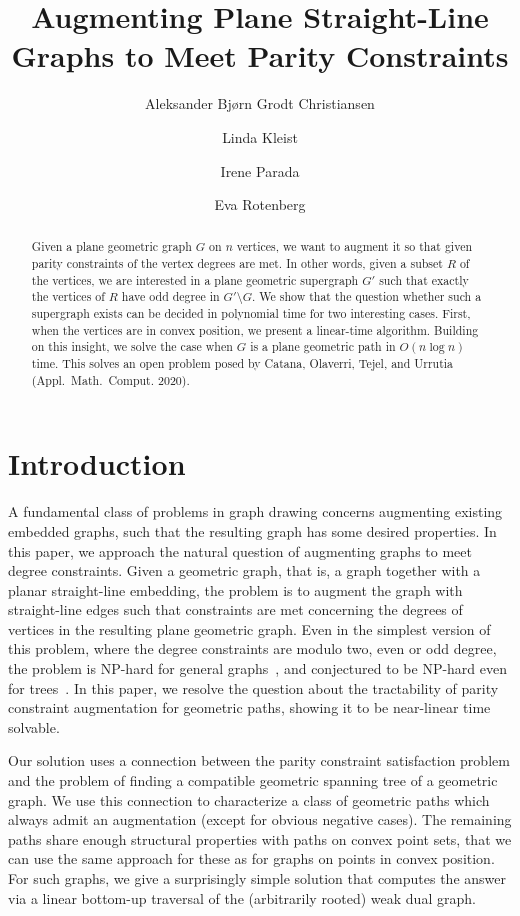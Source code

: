 \documentclass[a4paper,runningheads,cleveref,thm-restate]{lipics-v2021}
\title{Augmenting Plane Straight-Line Graphs to Meet Parity Constraints}
\author{Aleksander Bjørn Grodt Christiansen}{Technical University of Denmark, Denmark }{abgch@dtu.dk}{https://orcid.org/0000-0002-9486-9115}{Supported by the VILLUM Foundation grant 37507 ``Efficient Recomputations for Changeful Problems''}
\author{Linda Kleist}{Universität Potsdam, Potsdam, Germany}{linda.kleist.1@uni-potsdam.de}{https://orcid.org/0000-0002-3786-916X}{}
\author{Irene Parada}{Universitat Politècnica de Catalunya, Spain }{irene.parada@upc.edu}{https://orcid.org/0000-0003-3147-0083}{Serra Húnter fellow and acknowledges the support of Independent Research Fund Denmark grant 2020-2023 (9131-00044B) ``Dynamic Network Analysis'', the Margarita Salas Fellowship funded by the Ministry of Universities of Spain and the EU (NextGenerationEU), and grants PID2019-104129GB-I00 and PID2023-150725NB-I00 funded by MICIU/AEI/10.13039/
	501100011033.}
\author{Eva Rotenberg}{Technical University of Denmark, Denmark}{erot@dtu.dk}{https://orcid.org/0000-0001-5853-7909}{Partially supported by the VILLUM Foundation grant 37507 ``Efficient Recomputations for Changeful Problems'' and the Independent Research Fund Denmark grant 2020-2023 (9131-00044B) ``Dynamic Network Analysis''.}
\begin{document}
\maketitle
%
\begin{abstract}
	Given a plane geometric graph $G$ on $n$ vertices, we want to augment it so that given parity constraints of the vertex degrees are met.
	In other words, given a subset $R$ of the vertices, we are interested in a plane geometric 
	supergraph $G'$ such that exactly the vertices of $R$ have odd degree in $G'\setminus G$.
	We show that the question whether such a supergraph exists can be decided in 
	polynomial time 
	for two interesting cases. 
	First, when the vertices are in convex position, we present a linear-time algorithm. 
	Building on this insight, we solve the case when $G$ is a plane geometric path in $O(n \log n)$ time. 
	This solves an open problem posed by Catana, Olaverri, Tejel, and Urrutia (Appl.\ Math.\ Comput. 2020). 	
\end{abstract}

\section{Introduction}

A fundamental class of problems in graph drawing concerns augmenting existing embedded graphs, such that the resulting graph has some desired properties. In this paper, we approach the natural question of augmenting graphs to meet degree constraints. Given a geometric graph, that is, a graph together with a planar straight-line embedding, the problem is to augment the graph with straight-line edges such that constraints are met concerning the degrees of vertices in the resulting plane geometric graph. Even in the simplest version of this problem, where the degree constraints are modulo two, even or odd degree, the problem is NP-hard for general graphs~\cite{Catanaetal}, and conjectured to be NP-hard even for trees~\cite{Catanaetal}. In this paper, we resolve the question about the tractability of parity constraint augmentation for geometric paths, showing it to be near-linear time solvable. 

Our solution uses a connection between the parity constraint satisfaction problem and the problem of finding a compatible geometric spanning tree of a geometric graph. We use this connection to characterize a %
class of geometric paths which always admit an augmentation (except for obvious negative cases). The remaining paths share enough structural properties with paths on convex point sets, that we can use the same approach for these as for graphs on points in convex position. For such graphs, we give a surprisingly simple solution that computes the answer via a linear bottom-up traversal of the (arbitrarily rooted) weak dual graph. 
\end{document}
